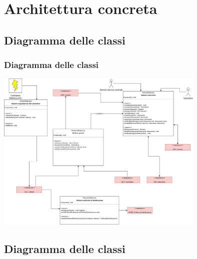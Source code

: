 \documentclass{beamer}
\begin{document}
	\section{Architettura concreta}
	
	\subsection{Diagramma delle classi}
	
\begin{frame}
	\frametitle{Diagramma delle classi}
		\begin{center}
		\includegraphics[width=0.75\textwidth, height=0.75\textheight, keepaspectratio=true]{diagramma_classi.png}
	\end{center}
\end{frame}

\subsection{Diagramma delle classi}
\end{document}
